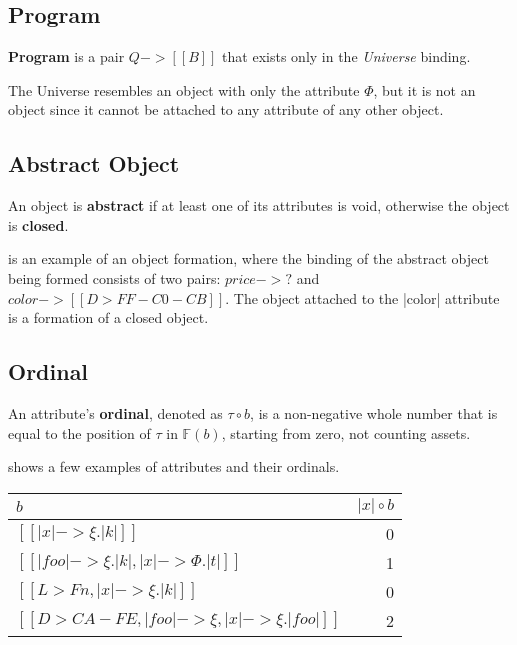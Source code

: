 \subsection{Program}\label{sec:program}

\begin{definition}[Program]
\textbf{Program} is a pair $ Q -> [[ B ]] $ that exists only
in the \textit{Universe} binding.
\end{definition}

The Universe resembles an object with only the attribute \(\Phi\), but it
is not an object since it cannot be attached to any attribute of any other object.

\subsection{Abstract Object}\label{sec:abstract}

\begin{definition}
An object is \textbf{abstract} if at least one of its attributes is void,
otherwise the object is \textbf{closed}.
\end{definition}

 is an example of an object formation, where the binding of
the abstract object being formed consists of two pairs: $price -> ?$ and
$color -> [[ D> FF-C0-CB ]]$. The object attached to the |color| attribute is a
formation of a closed object.

\subsection{Ordinal}\label{sec:ordinal}

\newcommand\ordinal[2]{#1 \circ #2}
\begin{definition}[Ordinal]
An attribute's \textbf{ordinal}, denoted as \(\ordinal{\tau}{b}\),
is a non-negative whole number that is equal to the position of \(\tau\)
in \(\mathbb{F}(b)\), starting from zero, not counting assets.
\end{definition}

\begin{example}
 shows a few examples of attributes and their ordinals.

\begin{table*}
\label{tab:ordinals}
\begin{tabular}{lr}
\toprule
\(b\) & \(\ordinal{|x|}{b}\) \\
\midrule
$[[ |x| -> \xi.|k| ]]$
  & 0 \\
$[[ |foo| -> \xi.|k|, |x| -> \Phi.|t| ]]$
  & 1 \\
$[[ L> Fn, |x| -> \xi.|k| ]]$
  & 0 \\
$[[ D> CA-FE, |foo| -> \xi, |x| -> \xi.|foo| ]]$
  & 2 \\
\bottomrule
\end{tabular}
\end{table*}
\end{example}

